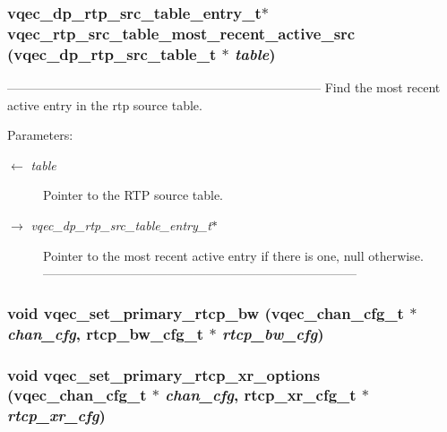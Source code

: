 \subsubsection{\setlength{\rightskip}{0pt plus 5cm}vqec\_\-dp\_\-rtp\_\-src\_\-table\_\-entry\_\-t$\ast$ vqec\_\-rtp\_\-src\_\-table\_\-most\_\-recent\_\-active\_\-src (vqec\_\-dp\_\-rtp\_\-src\_\-table\_\-t $\ast$ {\em table})}\label{vqec__rtp_8c_b3ff3d8702bde7ce7e9651c3c05b16a1}


--------------------------------------------------------------------------- Find the most recent active entry in the rtp source table.

\begin{Desc}
\item[Parameters:]
\begin{description}
\item[\mbox{$\leftarrow$} {\em table}]Pointer to the RTP source table. \item[\mbox{$\rightarrow$} {\em vqec\_\-dp\_\-rtp\_\-src\_\-table\_\-entry\_\-t$\ast$}]Pointer to the most recent active entry if there is one, null otherwise. --------------------------------------------------------------------------- \end{description}
\end{Desc}
\subsubsection{\setlength{\rightskip}{0pt plus 5cm}void vqec\_\-set\_\-primary\_\-rtcp\_\-bw (\bf{vqec\_\-chan\_\-cfg\_\-t} $\ast$ {\em chan\_\-cfg}, rtcp\_\-bw\_\-cfg\_\-t $\ast$ {\em rtcp\_\-bw\_\-cfg})}\label{vqec__rtp_8c_f87f2016b6057f77a3d30323125ac09a}


\subsubsection{\setlength{\rightskip}{0pt plus 5cm}void vqec\_\-set\_\-primary\_\-rtcp\_\-xr\_\-options (\bf{vqec\_\-chan\_\-cfg\_\-t} $\ast$ {\em chan\_\-cfg}, rtcp\_\-xr\_\-cfg\_\-t $\ast$ {\em rtcp\_\-xr\_\-cfg})}\label{vqec__rtp_8c_6c9e4a2caf94b7c042087d478f95139d}


